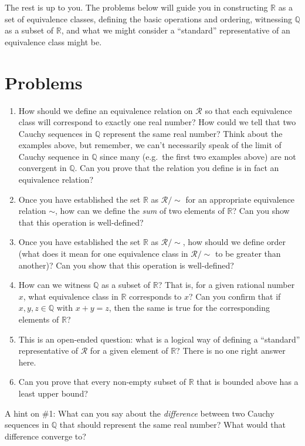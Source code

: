 \documentclass[
  letterpaper,
  DIV=11,
  numbers=noendperiod]{scrreprt}
\providecommand{\tightlist}{%
  \setlength{\itemsep}{0pt}\setlength{\parskip}{0pt}}
\def\R{\mathbb R}
\def\Q{\mathbb Q}
\theoremstyle{plain}
\theoremstyle{definition}
\theoremstyle{plain}
\theoremstyle{plain}
\theoremstyle{definition}
\theoremstyle{definition}
\theoremstyle{remark}
\begin{document}
The rest is up to you. The problems below will guide you in constructing
\(\R\) as a set of equivalence classes, defining the basic operations
and ordering, witnessing \(\Q\) as a subset of \(\R\), and what we might
consider a ``standard'' representative of an equivalence class might be.

\section{Problems}\label{problems}

\begin{enumerate}
\def\labelenumi{\arabic{enumi}.}
\tightlist
\item
  How should we define an equivalence relation on \(\mathcal R\) so that
  each equivalence class will correspond to exactly one real number? How
  could we tell that two Cauchy sequences in \(\Q\) represent the same
  real number? Think about the examples above, but remember, we can't
  necessarily speak of the limit of Cauchy sequence in \(\Q\) since many
  (e.g.~the first two examples above) are not convergent in \(\Q\). Can
  you prove that the relation you define is in fact an equivalence
  relation?
\item
  Once you have established the set \(\R\) as \(\mathcal R/\sim\) for an
  appropriate equivalence relation \(\sim\), how can we define the
  \emph{sum} of two elements of \(\R\)? Can you show that this operation
  is well-defined?
\item
  Once you have established the set \(\R\) as \(\mathcal R/\sim\), how
  should we define order (what does it mean for one equivalence class in
  \(\mathcal R/\sim\) to be greater than another)? Can you show that
  this operation is well-defined?
\item
  How can we witness \(\Q\) as a subset of \(\R\)? That is, for a given
  rational number \(x\), what equivalence class in \(\R\) corresponds to
  \(x\)? Can you confirm that if \(x,y,z\in\Q\) with \(x+y=z\), then the
  same is true for the corresponding elements of \(\R\)?
\item
  This is an open-ended question: what is a logical way of defining a
  ``standard'' representative of \(\mathcal R\) for a given element of
  \(\R\)? There is no one right answer here.
\item
  Can you prove that every non-empty subset of \(\R\) that is bounded
  above has a least upper bound?
\end{enumerate}

A hint on \#1: What can you say about the \emph{difference} between two
Cauchy sequences in \(\Q\) that should represent the same real number?
What would that difference converge to?
\end{document}
